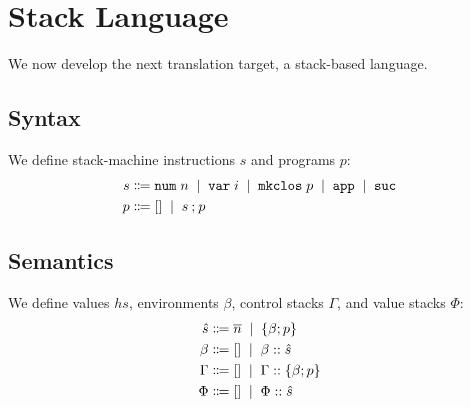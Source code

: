 \documentclass[12pt]{article}
\newcommand{\tup}[1]{\langle #1 \rangle}
\newcommand{\alt}{\;\; | \;\;}
\newcommand{\defi}{\Coloneqq}
\newcommand{\nil}{[]}
\newcommand{\h}[1]{\hat{#1}}
\newcommand{\n}[1]{\overline{#1}}
\newcommand{\cl}[2]{\{ #1 ; #2 \}}
\newcommand{\sapp}{\mathtt{app}}
\newcommand{\sev}[4]{\ensuremath{\langle #1; #2 \rangle \rightarrow \langle #3; #4 \rangle}}
\newcommand{\sevv}[3]{\ensuremath{#1 \vdash #2 \downarrow^{\mathrm{v}} #3}}
\newcommand{\e}{e} %
\renewcommand{\b}{b} %
\renewcommand{\h}{h}
\newcommand{\snum}{\mathtt{num} \;}
\newcommand{\svar}{\mathtt{var} \;}
\newcommand{\slam}{\mathtt{mkclos} \;}
\renewcommand{\sapp}{\mathtt{app}}
\begin{document}
\section*{Stack Language}

\renewcommand{\snum}[1]{\mathtt{num} \; #1}%
\renewcommand{\svar}[1]{\mathtt{var} \; #1}%
\renewcommand{\slam}[1]{\mathtt{mkclos} \; #1}%
\renewcommand{\sapp}{\mathtt{app}}%
\newcommand{\ssuc}{\mathtt{suc}}


\renewcommand{\b}{\beta}
\newcommand{\G}{\Gamma}
\newcommand{\Ph}{\Phi}
\newcommand{\Ps}{\Psi}

\newcommand{\hs}{\hat{s}}


\renewcommand{\sev}[2]{\ensuremath{#1 \downarrow #2}}%
\newcommand{\sstep}[4]{\ensuremath{\tup{#1, #2} \rightarrow \tup{#3, #4}}}
\newcommand{\ssteps}[4]{\ensuremath{\tup{#1, #2} \rightarrow^* \tup{#3, #4}}}
\renewcommand{\sevv}[3]{\ensuremath{#1 \vdash #2 \uparrow #3}}%


We now develop the next translation target, a stack-based language.

\subsection*{Syntax}

We define stack-machine instructions $s$ and programs $p$:
\begin{align*}
  s &\defi \snum{n} \alt \svar{i} \alt \slam{p} \alt \sapp \alt \ssuc \\
  p &\defi \nil \alt s \seq p
\end{align*}

\subsection*{Semantics}

We define values $\h{s}$, environments $\b$, control stacks $\G$, and value stacks $\Ph$:
\begin{align*}
  \hs &\defi \n{n} \alt \cl{\b}{p} \\
  \b &\defi \nil \alt \b \cons \hs \\
  \G &\defi \nil \alt \G \cons \cl{\b}{p} \\
  \Ph &\defi \nil \alt \Ph \cons \hs \\
\end{align*}
\end{document}
